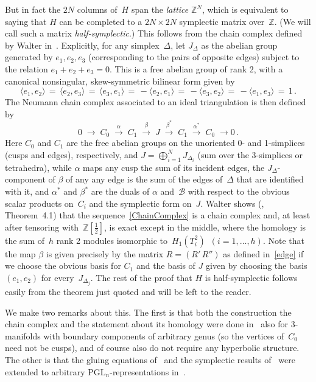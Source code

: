 \documentclass[12pt,reqno]{amsart}
\theoremstyle{definition}
\def\B{\mathcal B}  \def\hB{\widehat\B}
\def\b{\beta}
\def\PGL{\mathrm{PGL}}
\def\D{\Delta}
\def\a{\alpha}
\def\be{\begin{equation}}
\def\ee{\end{equation}}
\def\Z{\mathbb Z}
\begin{document}
But in fact the $2N$ columns of~$H$ span the {\it lattice} $\Z^N$, which is equivalent to 
saying that $H$ can be completed to a $2N\times2N$ symplectic matrix over~$\Z$. 
(We will call such a matrix {\it half-symplectic}.)
This follows from the chain complex defined by Walter in~\cite{N:combinatorics}.  
Explicitly, for any simplex~$\D$, let $J_\D$ as the abelian group generated by $e_1,e_2,e_3$ 
(corresponding to the pairs of opposite edges) subject to the relation $e_1+e_2+e_3=0$. 
This is a free abelian group of rank 2, with a canonical nonsingular, skew-symmetric bilinear 
form given by~\cite[Sec.4]{N:combinatorics}
\be
\label{omega}
\langle e_1, e_2 \rangle \,=\, \langle e_2, e_3 \rangle \,=\, \langle e_3, e_1 \rangle
\,=\, -\langle e_2, e_1 \rangle \,=\, - \langle e_3, e_2 \rangle 
\,=\,- \langle e_1, e_3 \rangle \,=\, 1\,.
\ee
The Neumann chain complex associated to an ideal triangulation is then defined by
\be
\label{ChainComplex}
 0 \;\longrightarrow\; C_0\;\stackrel\a\longrightarrow\; C_1\;\stackrel\b\longrightarrow\; 
 J\;\stackrel{\b^*}\longrightarrow\; C_1\;\stackrel{\a^*}\longrightarrow\;
 C_0\;\longrightarrow 0\,.
\ee
Here $C_0$ and $C_1$ are the free abelian groups on the unoriented 0- and 1-simplices
(cusps and edges), respectively, and $J=\bigoplus_{i=1}^NJ_{\D_i}$ (sum over the 3-simplices
or tetrahedra), while $\a$ maps any cusp the sum of its incident edges, the $J_\D$-component
of $\b$ of any any edge is the sum of the edges of~$\D$ that are identified with it, 
and $\a^*$ and $\b^*$ are the duals of $\a$ and~$\B$ with respect to the obvious scalar
products 
on~$C_i$ and the symplectic form on~$J$.  Walter shows (\cite{N:combinatorics}, Theorem~4.1) 
that the sequence~\eqref{ChainComplex} is a chain complex and, at least after 
tensoring with~$\Z[\frac12]$, is exact except in the middle, where the homology is the
sum of~$h$ rank 2 modules isomorphic to~$H_1(T^2_i)$~$(i=1,\dots,h)$.  Note that the map $\b$
is given precisely by the matrix $R=(R'\,R'')$ as defined in~\eqref{edge} if we choose the
obvious basis for $C_1$ and the basis of $J$ given by choosing the basis $(e_1,e_2)$ for
every~$J_{\D_j}$. The rest of the proof that $H$ is half-symplectic follows easily from the
theorem just quoted and will be left to the reader. 

We make two remarks about this.  The first is that both the construction the chain complex
and the statement about its homology were done in~\cite{N:combinatorics} also for 3-manifolds
with boundary components of arbitrary genus (so the vertices of~$C_0$ need not be cusps),
and of course also do not require any hyperbolic structure.  The other is that the gluing
equations of~\cite{NZ} and the symplectic results of~\cite{N:combinatorics} were extended to
arbitrary $\PGL_n$-representations in~\cite{GZi}.
\end{document}

